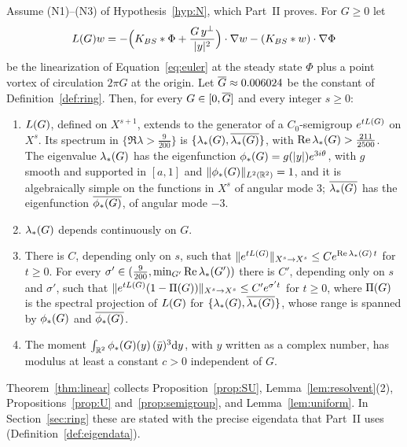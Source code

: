 \begin{theorem}
\label{thm:linear}
Assume \textup{(N1)}--\textup{(N3)} of Hypothesis~\ref{hyp:N}, which Part~II
proves. For $G\ge0$ let
\[
L(G)w=-\Big(K_{BS}\ast\Phi+\frac{G\,y^\perp}{|y|^2}\Big)\cdot\nabla w-(K_{BS}\ast w)\cdot\nabla\Phi
\]
be the linearization of Equation~\eqref{eq:euler} at the steady state $\Phi$ plus a
point vortex of circulation $2\pi G$ at the origin. Let $\overline{G}\approx0.006024$ be
the constant of Definition~\ref{def:ring}. Then, for every $G\in[0,\overline{G}]$ and
every integer $s\ge0$:
\begin{enumerate}[label=\textup{(\roman*)}]
\item $L(G)$, defined on $X^{s+1}$, extends to the generator of a
  $C_0$-semigroup $e^{tL(G)}$ on $X^s$. Its spectrum in
  $\{\Re\lambda>\frac9{200}\}$ is $\{\lambda_*(G),\overline{\lambda_*(G)}\}$, with
  $\Re\lambda_*(G)>\frac{211}{2500}$. The eigenvalue $\lambda_*(G)$ has the
  eigenfunction $\phi_*(G)=g(|y|)e^{3i\theta}$, with $g$ smooth and supported in
  $[a,1]$ and $\|\phi_*(G)\|_{L^2(\mathbb{R}^2)}=1$, and it is algebraically simple on the
  functions in $X^s$ of angular mode $3$; $\overline{\lambda_*(G)}$ has the
  eigenfunction $\overline{\phi_*(G)}$, of angular mode $-3$.
\item $\lambda_*(G)$ depends continuously on $G$.
\item There is $C$, depending only on $s$, such that
  $\|e^{tL(G)}\|_{X^s\to X^s}\le Ce^{\Re\lambda_*(G)\,t}$ for $t\ge0$. For every
  $\sigma'\in(\frac9{200},\min_{G'}\Re\lambda_*(G'))$ there is $C'$, depending only
  on $s$ and $\sigma'$, such that
  $\|e^{tL(G)}(1-\Pi(G))\|_{X^s\to X^s}\le C'e^{\sigma't}$ for $t\ge0$, where
  $\Pi(G)$ is the spectral projection of $L(G)$ for
  $\{\lambda_*(G),\overline{\lambda_*(G)}\}$, whose range is spanned by $\phi_*(G)$ and
  $\overline{\phi_*(G)}$.
\item The moment $\int_{\mathbb{R}^2}\phi_*(G)(y)\,(\bar y)^3\dd y$, with $y$ written as
  a complex number, has modulus at least a constant $c>0$ independent of $G$.
\end{enumerate}
\end{theorem}

Theorem~\ref{thm:linear} collects Proposition~\ref{prop:SU},
Lemma~\ref{lem:resolvent}(2), Propositions~\ref{prop:U} and~\ref{prop:semigroup},
and Lemma~\ref{lem:uniform}. In Section~\ref{sec:ring} these are stated with the
precise eigendata that Part~II uses (Definition~\ref{def:eigendata}).

